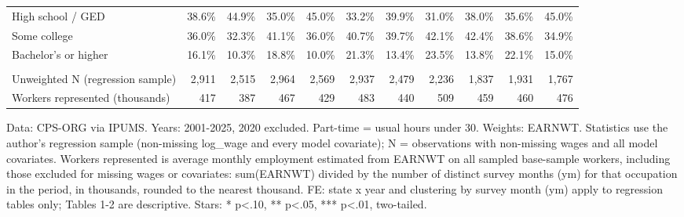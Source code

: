 \begin{table}[!t]
\begin{tabular*}{\linewidth}{@{\extracolsep{\fill}}l|rrrrrrrrrr}
High school / GED & 38.6\% & 44.9\% & 35.0\% & 45.0\% & 33.2\% & 39.9\% & 31.0\% & 38.0\% & 35.6\% & 45.0\% \\
Some college & 36.0\% & 32.3\% & 41.1\% & 36.0\% & 40.7\% & 39.7\% & 42.1\% & 42.4\% & 38.6\% & 34.9\% \\
Bachelor's or higher & 16.1\% & 10.3\% & 18.8\% & 10.0\% & 21.3\% & 13.4\% & 23.5\% & 13.8\% & 22.1\% & 15.0\% \\
\midrule\addlinespace[2.5pt]
\multicolumn{11}{l}{Sample} \\[2.5pt] 
\midrule\addlinespace[2.5pt]
Unweighted N (regression sample) & 2,911 & 2,515 & 2,964 & 2,569 & 2,937 & 2,479 & 2,236 & 1,837 & 1,931 & 1,767 \\
Workers represented (thousands) & 417 & 387 & 467 & 429 & 483 & 440 & 509 & 459 & 460 & 476 \\
\bottomrule
\end{tabular*}
\begin{minipage}{\linewidth}
Data: CPS-ORG via IPUMS. Years: 2001-2025, 2020 excluded. Part-time = usual hours under 30. Weights: EARNWT. Statistics use the author's regression sample (non-missing log\_wage and every model covariate); N = observations with non-missing wages and all model covariates. Workers represented is average monthly employment estimated from EARNWT on all sampled base-sample workers, including those excluded for missing wages or covariates: sum(EARNWT) divided by the number of distinct survey months (ym) for that occupation in the period, in thousands, rounded to the nearest thousand. FE: state x year and clustering by survey month (ym) apply to regression tables only; Tables 1-2 are descriptive. Stars: * p<.10, ** p<.05, *** p<.01, two-tailed.\\
\end{minipage}
\end{table}
